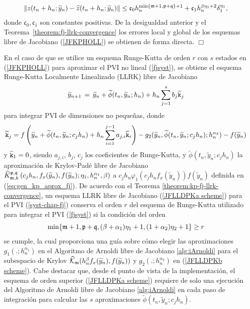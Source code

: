 \begin{equation*}
    \left\lVert z(t_n+h_n;\widetilde{y}_n)-\widehat{z}(t_n+h_n;\widetilde{y}_n) \right\rVert \leq \mathfrak{c}_0 h_n^{\min\{\mathfrak{m}+1,\mathfrak{p}+\mathfrak{q} \}+1} + \mathfrak{c}_1h_n^{\beta\eta_1+2}\delta_1^{\eta_1},
\end{equation*}
donde $\mathfrak{c}_0,\mathfrak{c}_1$ son constantes positivas. De la desigualdad anterior y el Teorema~\ref{theorem:fj-llrk-convergence} los errores local y global de los esquemas libre de Jacobiano (\ref{JFKPHOLL}) se obtienen de forma directa. $\Box$

En el caso de que se utilice un esquema Runge-Kutta de orden $r$ con $s$ estados en (\ref{JFKPHOLL}) para aproximar el PVI no lineal (\ref{fjsyst}), se obtiene el esquema Runge-Kutta Localmente Linealizado (LLRK) libre de Jacobiano
\begin{equation}  \label{JFLLDPKa scheme}
    \widetilde{y}_{n+1}\,=\,\widetilde{y}_n+\widetilde{\phi}(t_n,\widetilde{y}_n;h_n)+h_n \sum_{j=1}^{s}b_j \widetilde{\mathtt{k}}_j
\end{equation}
para integrar PVI de dimensiones no pequeñas, donde
\begin{equation} \label{JFLLDPKb scheme}
    \widetilde{\mathtt{k}}_j = f\left( \widetilde{y}_n+\widetilde{\phi}(t_n,\widetilde{y}_n;c_jh_n)+h_n \sum_{i=1}^{j-1}a_{j,i}\widetilde{\mathtt{k}}_i \right)  - g_2(\widetilde{y}_n,\widetilde{\phi}(t_n,\widetilde{y}_n;c_jh_n);h^{\alpha_2}_n) - f( \widetilde{y}_n)
\end{equation}
y $\widetilde{\mathtt{k}}_1=0$, siendo $a_{j,i}$, $b_j$, $c_j$ los coeficientes de Runge-Kutta, y $\widetilde{\phi}(t_n,\widetilde{ y}_n;c_jh_n)$ la aproximación de Krylov-Padé libre de Jacobiano $\widehat{K}_{\mathfrak{m},k}^{\mathfrak{p},\mathfrak{q}}\left(c_jh_n, f_x(\widetilde{y}_n) , f(\widetilde{y}_n) ; \eta_1, h_n^{\alpha_1}, \beta \right)$ a $c_jh_n\varphi_1(c_jh_nf_x(\widetilde {y}_n))f(\widetilde{y}_n)$ definida en (\ref{eq:gen_kp_aprox_fj}). De acuerdo con el Teorema \ref{theorem:kp-fj-llrk-convergence}, un esquema LLRK libre de Jacobiano (\ref{JFLLDPKa scheme}) para el PVI (\ref{syst-chap-fj}) conserva el orden $r$ del esquema de Runge-Kutta utilizado para integrar el PVI (\ref{fjsyst}) si la condición del orden
\begin{equation}\label{order condition}
    \min\{\mathfrak{m}+1,\mathfrak{p}+\mathfrak{q},(\beta+\alpha_1)\eta_1+1,(1+\alpha_2)\eta_2+1\} \geq r
\end{equation}
se cumple, la cual proporciona una guía sobre cómo elegir las aproximaciones $g_1(.;h^{\alpha_1}_n)$ en el Algoritmo de Arnoldi libre de Jacobiano \ref{alg:iArnoldi} para el subespacio de Krylov
$\widehat{\mathcal{K}}_{\mathfrak{m}}(h^\beta_n f_x(\widetilde{y}_n),f(\widetilde{y}_n))$ y $g_2(.;h^{\alpha_2}_n)$ en (\ref{JFLLDPKb scheme}). Cabe destacar que, desde el punto de vista de la implementación, el esquema de orden superior (\ref{JFLLDPKa scheme}) requiere de solo una ejecución del Algoritmo de Arnoldi libre de Jacobiano \ref{alg:iArnoldi} en cada paso de integración para calcular las $s$ aproximaciones $ \widetilde{\phi}(t_n,\widetilde{y}_n;c_jh_n)$.


